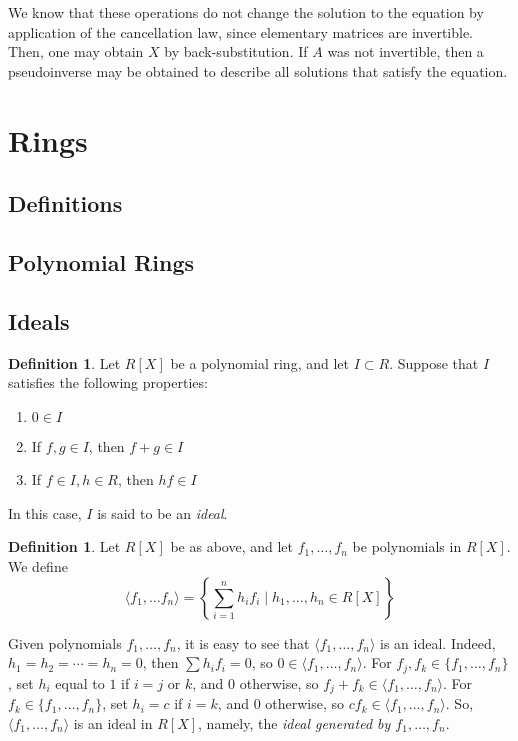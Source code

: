 \documentclass{amsart}
\theoremstyle{definition}
\newtheorem{definition}[theorem]{Definition}
\theoremstyle{remark}
\numberwithin{equation}{section}
\begin{document}
    We know that these operations do not change the solution to the equation by application of the cancellation law, since elementary matrices are invertible. Then, one may obtain $X$ by back-substitution. If $A$ was not invertible, then a pseudoinverse may be obtained to describe all solutions that satisfy the equation.

\section{Rings}

\subsection{Definitions}

\subsection{Polynomial Rings}

\subsection{Ideals}

\begin{definition}
  Let $R[X]$ be a polynomial ring, and let $I \subset R$. Suppose that $I$ satisfies the following properties:
  \begin{enumerate}[i]
  \item $0 \in I$
  \item If $f, g \in I$, then $f + g \in I$
  \item If $f \in I, h \in R$, then $hf \in I$
  \end{enumerate}
  In this case, $I$ is said to be an \emph{ideal}.
\end{definition}

\begin{definition}
  Let $R[X]$ be as above, and let $f_1, \ldots, f_n$ be polynomials in $R[X]$. We define
  \begin{equation*}
    \langle f_1, \ldots f_n \rangle = \left\{ \sum_{i = 1}^n h_i f_i \mid h_1, \ldots, h_n \in R[X] \right\}
  \end{equation*}
\end{definition}

Given polynomials $f_1, \ldots, f_n$, it is easy to see that $\langle f_1, \ldots, f_n \rangle$ is an ideal. Indeed, $h_1 = h_2 = \cdots = h_n = 0$, then $\sum h_i f_i = 0$, so $0 \in \langle f_1, \ldots, f_n \rangle$. For $f_j, f_k \in \{ f_1, \ldots, f_n \}$, set $h_i$ equal to $1$ if $i = j$ or $k$, and $0$ otherwise, so $f_j + f_k \in \langle f_1, \ldots, f_n \rangle$. For $f_k \in \{ f_1, \ldots, f_n \}$, set $h_i = c$ if $i = k$, and $0$ otherwise, so $c f_k \in \langle f_1, \ldots, f_n \rangle$. So, $\langle f_1, \ldots, f_n \rangle$ is an ideal in $R[X]$, namely, the \emph{ideal generated by $f_1, \ldots, f_n$}.
\end{document}
